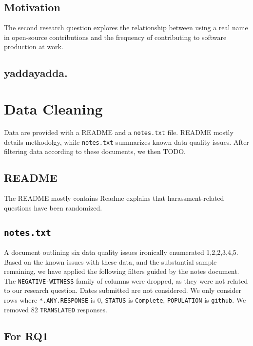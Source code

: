 \documentclass[journal,12pt,onecolumn,]{IEEEtran}
\begin{document}
\subsection{Motivation}

The second research question explores the relationship between using a real name in open-source contributions and the frequency of contributing to software production at work.

\subsection{yaddayadda.}

\section{Data Cleaning}

Data are provided with a \textsc{README} and a \texttt{notes.txt} file.
\textsc{README} mostly details methodolgy, while \texttt{notes.txt} summarizes known data quality issues.
After filtering data according to these documents, we then TODO.

\subsection{\textsc{README}}

The \textsc{README} mostly contains Readme explains that harassment-related questions have been randomized.

\subsection{\texttt{notes.txt}}

A document outlining six data quality issues ironically enumerated 1,2,2,3,4,5.
Based on the known issues with these data, and the substantial sample remaining, we have applied the following filters guided by the notes document.
The \texttt{NEGATIVE-WITNESS} family of columns were dropped, as they were not related to our research question.
Dates submitted are not considered.
We only consider rows where \texttt{*.ANY.RESPONSE} is 0, \texttt{STATUS} is \texttt{Complete}, \texttt{POPULATION} is \texttt{github}.
We removed 82 \texttt{TRANSLATED} responses.

\subsection{For RQ1}
\end{document}
